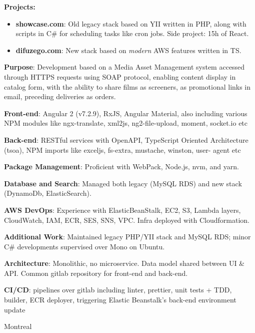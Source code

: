 \documentclass[
  a4paper,
   maincolor=cvblue,
   sectioncolor=cvblue,
   sidebarwidth=0.323\paperwidth,
]{fortysecondscv}
\begin{document}
\begin{cvtableNew}
{        \vspace{0.1pt} %
        \textbf{Projects:}
        \begin{itemize}[itemsep=1mm, topsep=5pt, leftmargin=8pt]
          \item \textbf{showcase.com}: Old legacy stack based on YII written in PHP, along with scripts in C\# for scheduling tasks like cron jobs. Side project: 15h of React.
          \item \textbf{difuzego.com}: New stack based on \textit{modern} AWS features written in TS.
        \end{itemize}

        \vspace{4pt} %
        \textbf{Purpose}: Development based on a Media Asset Management system accessed through HTTPS requests using SOAP protocol, enabling content display in catalog form, with the ability to share films as screeners, as promotional links in email, preceding deliveries as orders.\vspace{5pt}

        \textbf{Front-end}: Angular 2 (v7.2.9), RxJS, Angular Material, also including various NPM modules like ngx-translate, xml2js, ng2-file-upload, moment, socket.io etc\vspace{5pt}

        \textbf{Back-end}: RESTful services with OpenAPI, TypeScript Oriented Architecture (tsoa), NPM imports like exceljs, fs-extra, mustache, winston, user-
        agent etc\vspace{5pt}

        \textbf{Package Management}: Proficient with WebPack, Node.js, nvm, and yarn.\vspace{5pt}

        \textbf{Database and Search}: Managed both legacy (MySQL RDS) and new stack (DynamoDb, ElasticSearch).\vspace{5pt}

        \textbf{AWS DevOps}: Experience with ElasticBeanStalk, EC2, S3, Lambda layers, CloudWatch, IAM, ECR, SES, SNS, VPC. Infra deployed with Cloudformation.\vspace{5pt}

        \textbf{Additional Work}: Maintained legacy PHP/YII stack and MySQL RDS; minor C\# developments supervised over Mono on Ubuntu.\vspace{5pt}

        \textbf{Architecture}: Monolithic, no microservice. Data model shared between UI \& API. Common gitlab repository for front-end and back-end.\vspace{5pt}

        \textbf{CI/CD}: pipelines over gitlab including linter, prettier, unit tests + TDD, builder, ECR deployer, triggering Elastic Beanstalk's back-end environment update
      }
    {Montreal} %
\end{cvtableNew}
\end{document}
